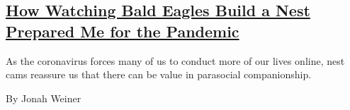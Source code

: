 \begin{enumerate}
  \hypertarget{how-watching-bald-eagles-build-a-nest-prepared-me-for-the-pandemic}{%
  \subsection{\texorpdfstring{\href{/2020/05/12/magazine/how-watching-bald-eagles-build-a-nest-prepared-me-for-the-pandemic.html}{How
  Watching Bald Eagles Build a Nest Prepared Me for the
  Pandemic}}{How Watching Bald Eagles Build a Nest Prepared Me for the Pandemic}}\label{how-watching-bald-eagles-build-a-nest-prepared-me-for-the-pandemic}}

  As the coronavirus forces many of us to conduct more of our lives
  online, nest cams reassure us that there can be value in parasocial
  companionship.

  By Jonah Weiner
\end{enumerate}

